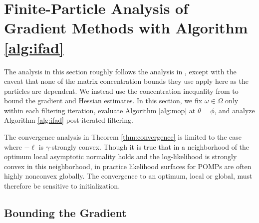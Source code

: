 \documentclass{article}
\begin{document}
\section{Finite-Particle Analysis of Gradient Methods with Algorithm \ref{alg:ifad}}
\label{app:ifad}

The analysis in this section roughly follows the analysis in \cite{mahoney16}, except with the caveat that none of the matrix concentration bounds they use apply here as the particles are dependent. We instead use the concentration inequality from \cite{delmoral2011ci} to bound the gradient and Hessian estimates. In this section, we fix $\omega \in \Omega$ only within each filtering iteration, evaluate Algorithm \ref{alg:mop} at $\theta=\phi$, and analyze Algorithm \ref{alg:ifad} post-iterated filtering.


The convergence analysis in Theorem \ref{thm:convergence} is limited to the case where $-\ell$ is $\gamma$-strongly convex. Though it is true that in a neighborhood of the optimum local asymptotic normality holds and the log-likelihood is strongly convex in this neighborhood, in practice likelihood surfaces for POMPs are often highly nonconvex globally. The convergence to an optimum, local or global, must therefore be sensitive to initialization.  

\subsection{Bounding the Gradient}

\end{document}
